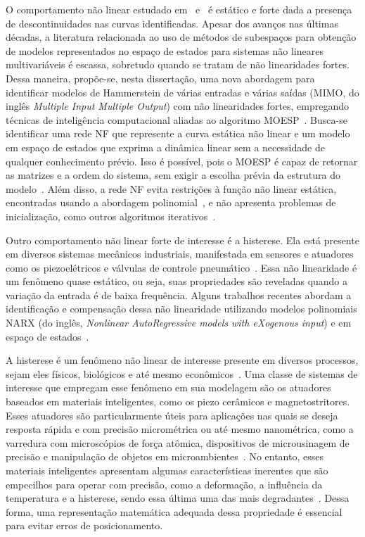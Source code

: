 O comportamento não linear estudado em~\citep{jia2005} e~\citep{jia2016} é estático e forte dada a presença de descontinuidades nas curvas identificadas. Apesar dos avanços nas últimas décadas, a literatura relacionada ao uso de métodos de subespaços para obtenção de modelos representados no espaço de estados para sistemas não lineares multivariáveis é escassa, sobretudo quando se tratam de não linearidades fortes. Dessa maneira, propõe-se, nesta dissertação, uma nova abordagem para identificar modelos de Hammerstein de várias entradas e várias saídas (\acs{MIMO}, do inglês \textit{Multiple Input Multiple Output}) com não linearidades fortes, empregando técnicas de inteligência computacional aliadas ao algoritmo \acs{MOESP}~\citep{verhaegen1992a}. Busca-se identificar uma rede \acs{NF} que represente a curva estática não linear e um modelo em espaço de estados que exprima a dinâmica linear sem a necessidade de qualquer conhecimento prévio. Isso é possível, pois o \acs{MOESP} é capaz de retornar as matrizes e a ordem do sistema, sem exigir a escolha prévia da estrutura do modelo~\citep{verhaegen1992a}. Além disso, a rede \acs{NF} evita restrições à função não linear estática, encontradas usando a abordagem polinomial~\citep{jia2005}, e não apresenta problemas de inicialização, como outros algoritmos iterativos~\citep{Chen2011}.
\par 
Outro comportamento não linear forte de interesse é a histerese. Ela está presente em diversos sistemas mecânicos industriais, manifestada em sensores e atuadores como os piezoelétricos e válvulas de controle pneumático~\citep{abreu2020}. Essa não linearidade é um fenômeno quase estático, ou seja, suas propriedades são reveladas quando a variação da entrada é de baixa frequência. Alguns trabalhos recentes abordam a identificação e compensação dessa não linearidade utilizando modelos polinomiais \acs{NARX} (do inglês, \textit{Nonlinear AutoRegressive models with eXogenous input}) e em espaço de estados~\citep{noel2017,abreu2020,tavares2022}. 
\par
A histerese é um fenômeno não linear de interesse presente em diversos processos, sejam eles físicos, biológicos e até mesmo econômicos~\citep{tan2009,hane2022}. Uma classe de sistemas de interesse que empregam esse fenômeno em sua modelagem são os atuadores baseados em materiais inteligentes, como os piezo cerâmicos e magnetostritores. Esses atuadores são particularmente úteis para aplicações nas quais se deseja resposta rápida e com precisão micrométrica ou até mesmo nanométrica, como a varredura com microscópios de força atômica, dispositivos de microusinagem de precisão e manipulação de objetos em microambientes~\citep{kwac2010,aljanaideh2018,tao2020}. No entanto, esses materiais inteligentes apresentam algumas características inerentes que são empecilhos para operar com precisão, como a deformação, a influência da temperatura e a histerese, sendo essa última uma das mais degradantes~\citep{gan2019}. Dessa forma, uma representação matemática adequada dessa propriedade é essencial para evitar erros de posicionamento.
